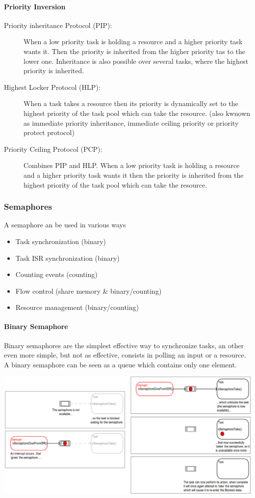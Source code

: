 \paragraph{Priority Inversion}
\begin{description}
  \item[Priority inheritance Protocol (PIP):] When a low priority task is holding a resource and a higher priority task wants it.
        Then the priority is inherited from the higher priority tas to the lower one.
        Inheritance is also possible over several tasks, where the highest priority is inherited.
  \item[Highest Locker Protocol (HLP):] When a task takes a resource then its priority is dynamically set to the highest priority of the task pool which can take the resource.
        (also kwnown as immediate priority inheritance, immediate ceiling priority or priority protect protocol)
  \item[Priority Ceiling Protocol (PCP):] Combines PIP and HLP.
        When a low priority task is holding a resource and a higher priority task wants it then the priority is inherited from the highest priority of the task pool which can take the resource.
\end{description}

\subsubsection{Semaphores}
A semaphore an be used in various ways
\begin{itemize}
  \item Task synchronization (binary)
  \item Task ISR synchronization (binary)
  \item Counting events (counting)
  \item Flow control (share memory \& binary/counting)
  \item Resource management (binary/counting)
\end{itemize}

\paragraph{Binary Semaphore}
Binary semaphores are the simplest effective way to synchronize tasks, an other even more simple, but not as effective, consists in polling an input or a resource.
A binary semaphore can be seen as a queue which contains only one element.

\includegraphics[width=\textwidth]{images/Concurrency/binary_semaphore.png}


